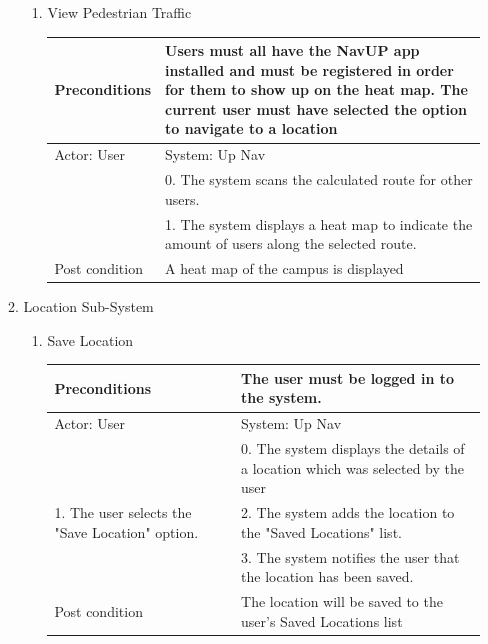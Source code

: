 \documentclass{article}
\begin{document}
\begin{enumerate}
\begin{center}
\begin{enumerate}
\begin{enumerate}
	\item{View Pedestrian Traffic}
	\begin{table}[H]
	\centering
		\begin{tabular}{ | p{15em} | p{15em}| }
		\hline
		Preconditions													& Users must all have the NavUP app installed and must be registered in order for them to show up on the heat map. The current user must have selected the option to navigate to a location \\
		\hline
		Actor: User														& System: Up Nav \\
		\hline
																	& 0. The system scans the calculated route for other users. \\
		\hline
																	& 1. The system displays a heat map to indicate the amount of users along the selected route. \\
		\hline
		Post condition													& A heat map of the campus is displayed \\
		\hline

		\end{tabular}
	\end{table}
	\end{enumerate}

\item{Location Sub-System}

	\begin{enumerate}

	\item{Save Location}

	\begin{table}[H]
	\centering
		\begin{tabular}{ | p{15em} | p{15em}| }
		\hline
		Preconditions                                    										& The user must be logged in to the system.  \\ 
		\hline
		Actor: User                                     										& System: Up Nav                                                                  \\ 
		\hline
                                               													& 0. The system displays the details of a location which was selected by the user \\
		\hline
		1. The user selects the "Save Location" option. 								& 2. The system adds the location to the "Saved Locations" list. \\
		\hline
                                                													& 3. The system notifies the user that the location has been saved. \\
		\hline
		Post condition                                   										& The location will be saved to the user's Saved Locations list \\
		\hline
		\end{tabular}
	\end{table}


\end{enumerate}
\end{enumerate}
\end{center}
\end{enumerate}
\end{document}
